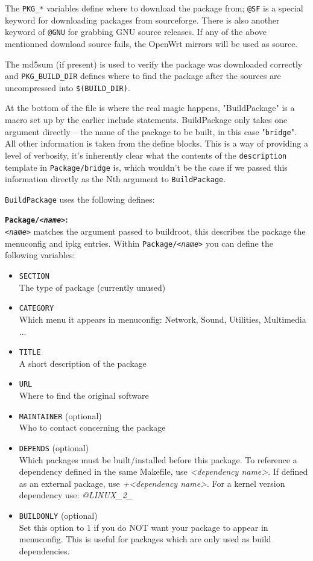 The \texttt{PKG\_*} variables define where to download the package from;
\texttt{@SF} is a special keyword for downloading packages from sourceforge. There is also
another keyword of \texttt{@GNU} for grabbing GNU source releases. If any of the above mentionned download source fails, the OpenWrt mirrors will be used as source.

The md5sum (if present) is used to verify the package was downloaded correctly and
\texttt{PKG\_BUILD\_DIR} defines where to find the package after the sources are
uncompressed into \texttt{\$(BUILD\_DIR)}.

At the bottom of the file is where the real magic happens, "BuildPackage" is a macro
set up by the earlier include statements. BuildPackage only takes one argument directly --
the name of the package to be built, in this case "\texttt{bridge}". All other information
is taken from the define blocks. This is a way of providing a level of verbosity, it's
inherently clear what the contents of the \texttt{description} template in
\texttt{Package/bridge} is, which wouldn't be the case if we passed this information
directly as the Nth argument to \texttt{BuildPackage}.

\texttt{BuildPackage} uses the following defines:

\textbf{\texttt{Package/\textit{<name>}}:} \\
    \texttt{\textit{<name>}} matches the argument passed to buildroot, this describes
    the package the menuconfig and ipkg entries. Within \texttt{Package/\textit{<name>}}
    you can define the following variables:

    \begin{itemize}
        \item \texttt{SECTION} \\
            The type of package (currently unused)
        \item \texttt{CATEGORY} \\
            Which menu it appears in menuconfig: Network, Sound, Utilities, Multimedia ...
        \item \texttt{TITLE} \\
            A short description of the package
        \item \texttt{URL} \\
            Where to find the original software
        \item \texttt{MAINTAINER} (optional) \\
            Who to contact concerning the package
        \item \texttt{DEPENDS} (optional) \\
            Which packages must be built/installed before this package. To reference a dependency defined in the
			same Makefile, use \textit{<dependency name>}. If defined as an external package, use 
			\textit{+<dependency name>}. For a kernel version dependency use: \textit{@LINUX\_2\_<minor version>}
		\item \texttt{BUILDONLY} (optional) \\
			Set this option to 1 if you do NOT want your package to appear in menuconfig.
			This is useful for packages which are only used as build dependencies.
    \end{itemize}

